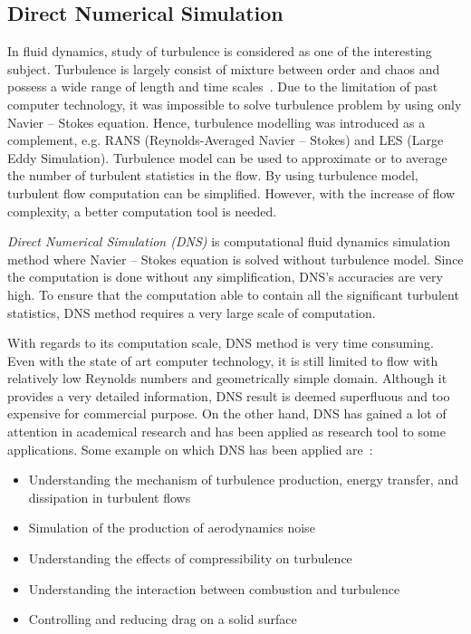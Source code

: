 \subsection{Direct Numerical Simulation}  
In fluid dynamics, study of turbulence is considered as one of the interesting subject. Turbulence is largely consist of mixture between order and chaos and possess a wide range of length and time scales~\cite{parviz}. Due to the limitation of past computer technology, it was impossible to solve turbulence problem by using only Navier -- Stokes equation. Hence, turbulence modelling was introduced as a complement, e.g.  RANS (Reynolds-Averaged Navier -- Stokes) and LES (Large Eddy Simulation). Turbulence model can be used to approximate or to average the number of turbulent statistics in the flow. By using turbulence model, turbulent flow computation can be simplified.  However, with the increase of flow complexity, a better computation tool is needed.

\emph{Direct Numerical Simulation (DNS)} is computational fluid dynamics simulation method where Navier -- Stokes equation is solved without turbulence model. Since the computation is done without any simplification, DNS's accuracies are very high. To ensure that the computation able to contain all the significant turbulent statistics, DNS method requires a very large scale of computation.

With regards to its computation scale, DNS method is very time consuming. Even with the state of art computer technology, it is still limited to flow with relatively low Reynolds numbers and geometrically simple domain. Although it provides a very detailed information,  DNS result is deemed superfluous and too expensive for commercial purpose. On the other hand, DNS has gained a lot of attention in academical research and has been applied as research tool to some applications. Some example on which DNS has been applied are~\cite{ferziger}:

\begin{itemize}
\item Understanding the mechanism of turbulence production, energy transfer, and dissipation in turbulent flows
\item Simulation of the production of aerodynamics noise
\item Understanding the effects of compressibility on turbulence
\item Understanding the interaction between combustion and turbulence
\item Controlling and reducing drag on a solid surface
\end{itemize}

